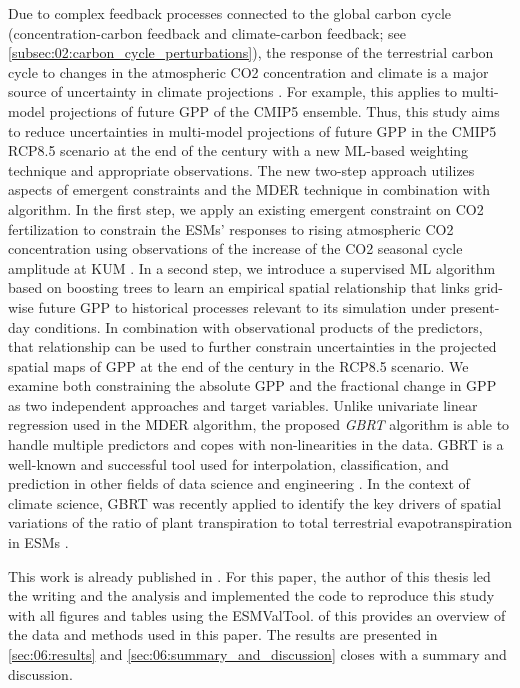 Due to complex feedback processes connected to the global carbon cycle
(concentration-carbon feedback and climate-carbon feedback; see
\cref{subsec:02:carbon_cycle_perturbations}), the response of the terrestrial
carbon cycle to changes in the atmospheric \ac{CO2} concentration and climate
is a major source of uncertainty in climate projections \autocite{Bodman2013,
  Booth2012, Collins2013}. For example, this applies to multi-model projections
of future \ac{GPP} of the \acs{CMIP}5 ensemble. Thus, this study aims to reduce
uncertainties in multi-model projections of future \ac{GPP} in the \acs{CMIP}5
\acs{RCP}8.5 scenario at the end of the  century with a new
\acs{ML}-based weighting technique and appropriate observations. The new
two-step approach utilizes aspects of emergent constraints and the \ac{MDER}
technique in combination with  algorithm. In the first step, we apply
an existing emergent constraint on \ac{CO2} fertilization \autocite{Wenzel2016}
to constrain the \acp{ESM}' responses to rising atmospheric \ac{CO2}
concentration using observations of the increase of the \ac{CO2} seasonal cycle
amplitude at \ac{KUM} \autocite{Keeling2005}. In a second step, we introduce a
supervised \ac{ML} algorithm based on boosting trees \autocite{Friedman2001} to
learn an empirical spatial relationship that links grid-wise future \ac{GPP} to
historical processes relevant to its simulation under present-day conditions.
In combination with observational products of the predictors, that relationship
can be used to further constrain uncertainties in the projected spatial maps of
\ac{GPP} at the end of the  century in the \acs{RCP}8.5 scenario. We
examine both constraining the absolute \ac{GPP} and the fractional change in
\ac{GPP} as two independent approaches and target variables. Unlike univariate
linear regression used in the \ac{MDER} algorithm, the proposed
\emph{\ac{GBRT}} algorithm is able to handle multiple predictors and copes with
non-linearities in the data. \Ac{GBRT} is a well-known and successful tool used
for interpolation, classification, and prediction in other fields of data
science and engineering \autocite{Death2007, Elith2008}. In the context of
climate science, \ac{GBRT} was recently applied to identify the key drivers of
spatial variations of the ratio of plant transpiration to total terrestrial
evapotranspiration in \acp{ESM} \autocite{Lian2018}.

This work is already published in \textcite{Schlund2020}. For this paper, the
author of this thesis led the writing and the analysis and implemented the code
to reproduce this study with all figures and tables using the \ac{ESMValTool}.
 of this  provides an
overview of the data and methods used in this paper. The results are presented
in \cref{sec:06:results} and \cref{sec:06:summary_and_discussion} closes with a
summary and discussion.


